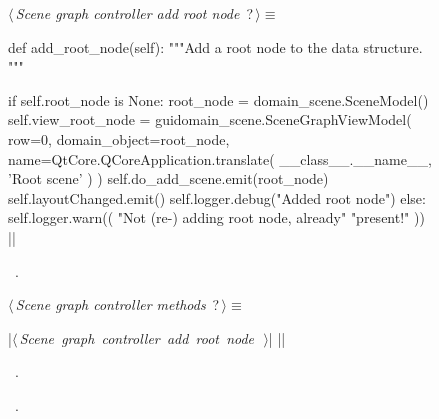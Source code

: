 \documentclass[%
    a4paper,    %
    justified,  %
    nobib,      %
    openany     %
]{tufte-book}
\begin{document}
\begin{figure}
\begin{flushleft} \small
\begin{minipage}{\linewidth}\label{scrap27}\raggedright\small
{} $\langle\,${\itshape Scene graph controller add root node}\nobreak\ {\footnotesize {?}}$\,\rangle\equiv$
\vspace{-1ex}
\begin{pythoncode}
def add_root_node(self):
    """Add a root node to the data structure.
    """

    if self.root_node is None:
        root_node = domain_scene.SceneModel()
        self.view_root_node = guidomain_scene.SceneGraphViewModel(
            row=0,
            domain_object=root_node,
            name=QtCore.QCoreApplication.translate(
                __class__.__name__, 'Root scene'
            )
        )
        self.do_add_scene.emit(root_node)
        self.layoutChanged.emit()
        self.logger.debug("Added root node")
    else:
    self.logger.warn((
        "Not (re-) adding root node, already"
        "present!"
    ))
|\NWsep|
\end{pythoncode}
\vspace{1.5ex}
\footnotesize
\begin{list}{}{\setlength{\itemsep}{-\parsep}\setlength{\itemindent}{-\leftmargin}}
\item \NWtxtMacroRefIn\ .

\item{}
\end{list}
\end{minipage}\vspace{4ex}
\end{flushleft}
\begin{flushleft} \small
\begin{minipage}{\linewidth}\label{scrap28}\raggedright\small
{} $\langle\,${\itshape Scene graph controller methods}\nobreak\ {\footnotesize {?}}$\,\rangle\equiv$
\vspace{-1ex}
\begin{pythoncode}
|\hbox{$\langle\,${\itshape Scene graph controller add root node}\nobreak\ {\footnotesize {}}$\,\rangle$}|
|\NWsep|
\end{pythoncode}
\vspace{1.5ex}
\footnotesize
\begin{list}{}{\setlength{\itemsep}{-\parsep}\setlength{\itemindent}{-\leftmargin}}
\item \NWtxtMacroDefBy\ .
\item \NWtxtMacroRefIn\ .


\end{list}
\end{minipage}
\end{flushleft}
\end{figure}
\end{document}
